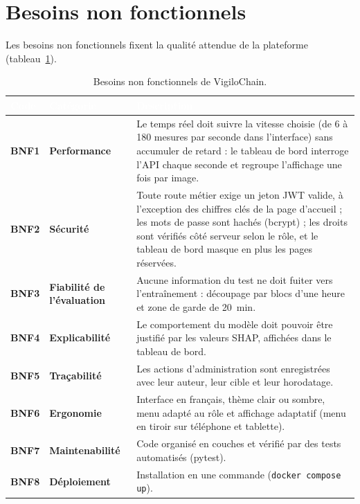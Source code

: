 \section{Besoins non fonctionnels}
\label{sec:bnf}

Les besoins non fonctionnels fixent la qualité attendue de la plateforme
(tableau~\ref{tab:bnf}).

\begin{table}[H]
\centering
\small
\renewcommand{\arraystretch}{1.4}
\setlength{\arrayrulewidth}{0.8pt}
\caption{Besoins non fonctionnels de VigiloChain.}
\label{tab:bnf}
\begin{tabularx}{\textwidth}{@{}>{\bfseries}p{1.4cm} >{\bfseries}p{3.2cm} >{\raggedright\arraybackslash}X@{}}
\rowcolor{thead}
\textcolor{white}{\textbf{Code}} & \textcolor{white}{\textbf{Catégorie}} &
\textcolor{white}{\textbf{Description}} \\
\hline
BNF1 & Performance &
Le temps réel doit suivre la vitesse choisie (de 6 à 180 mesures par seconde
dans l'interface) sans accumuler de retard : le tableau de bord interroge l'API
chaque seconde et regroupe l'affichage une fois par image. \\
\rowcolor{trowa}
BNF2 & Sécurité &
Toute route métier exige un jeton JWT valide, à l'exception des chiffres clés
de la page d'accueil ; les mots de passe sont hachés (bcrypt) ; les droits sont
vérifiés côté serveur selon le rôle, et le tableau de bord masque en plus les
pages réservées. \\
BNF3 & Fiabilité de l'évaluation &
Aucune information du test ne doit fuiter vers l'entraînement : découpage par
blocs d'une heure et zone de garde de 20~min. \\
\rowcolor{trowa}
BNF4 & Explicabilité &
Le comportement du modèle doit pouvoir être justifié par les valeurs SHAP,
affichées dans le tableau de bord. \\
BNF5 & Traçabilité &
Les actions d'administration sont enregistrées avec leur auteur, leur cible
et leur horodatage. \\
\rowcolor{trowa}
BNF6 & Ergonomie &
Interface en français, thème clair ou sombre, menu adapté au rôle et
affichage adaptatif (menu en tiroir sur téléphone et tablette). \\
BNF7 & Maintenabilité &
Code organisé en couches et vérifié par des tests automatisés (pytest). \\
\rowcolor{trowa}
BNF8 & Déploiement &
Installation en une commande (\texttt{docker compose up}). \\
\hline
\end{tabularx}
\end{table}

